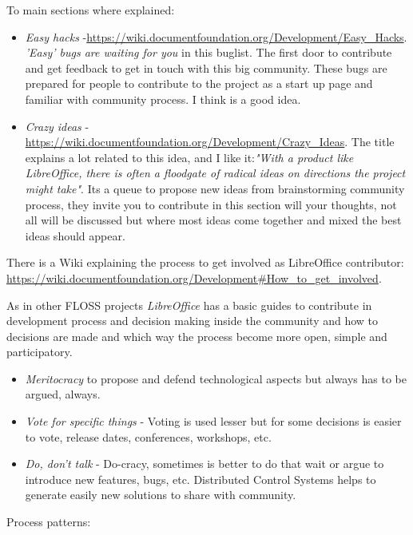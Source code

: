 \par To main sections where explained:

\begin{itemize}
	\item \textit{Easy hacks} -\url{https://wiki.documentfoundation.org/Development/Easy_Hacks}. \textit{'Easy' bugs are waiting for you} in this buglist. The first door to contribute and get feedback to get in touch with this big community. These bugs are prepared for people to contribute to the project as a start up page and familiar with community process. I think is a good idea.
	\item \textit{Crazy ideas} - \url{https://wiki.documentfoundation.org/Development/Crazy_Ideas}. The title explains a lot related to this idea, and I like it:\textit{"With a product like LibreOffice, there is often a floodgate of radical ideas on directions the project might take"}. Its a queue to propose new ideas from brainstorming community process, they invite you to contribute in this section will your thoughts, not all will be discussed but where most ideas come together and mixed the best ideas should appear.
\end{itemize}

\par There is a Wiki explaining the process to get involved as LibreOffice contributor: \url{https://wiki.documentfoundation.org/Development#How_to_get_involved}.

\par As in other FLOSS projects \textit{LibreOffice} has a basic guides to contribute in development process and decision making inside the community and how to decisions are made and which way the process become more open, simple and participatory.

\begin{itemize}
	\item \textit{Meritocracy} to propose and defend technological aspects but always has to be argued, always.
	\item \textit{Vote for specific things} - Voting is used lesser but for some decisions is easier to vote, release dates, conferences, workshops, etc.
	\item \textit{Do, don't talk} - Do-cracy, sometimes is better to do that wait or argue to introduce new features, bugs, etc. Distributed Control Systems helps to generate easily new solutions to share with community.
\end{itemize}

\par Process patterns:

